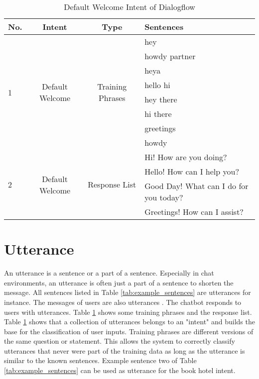 \begin{table}[H]
    \centering
    \begin{tabular}{ l | c | c | l }
  No. & Intent & Type & Sentences \\ \hline \hline
  \multirow{8}{*}{1}
  & \multirow{8}{*}{Default Welcome} & \multirow{8}{*}{Training Phrases} & hey \\
      & & & howdy partner\\
      & & & heya\\ 
      & & & hello hi\\ 
      & & & hey there\\ 
      & & & hi there\\ 
      & & & greetings\\ 
      & & & howdy \\ \hline
  \multirow{4}{*}{2}
  & \multirow{4}{*}{Default Welcome} & \multirow{4}{*}{Response List} & Hi! How are you doing? \\
      & & & Hello! How can I help you?\\
      & & & Good Day! What can I do for you today?\\ 
      & & & Greetings! How can I assist?\\ \hline
\end{tabular}
    \caption{Default Welcome Intent of Dialogflow} \label{tab:defaultwelcomedialogflow}
\end{table} \noindent



\section{Utterance} \label{sec:utterance}
An utterance is a sentence or a part of a sentence.
Especially in chat environments, an utterance is often just a part of a sentence to shorten the message. 
All sentences listed in Table \ref{tab:example_sentences} are utterances for instance.
The messages of users are also utterances \cite{singhbuilding, dutta2017developing}.
The chatbot responds to users with utterances.
Table \ref{tab:defaultwelcomedialogflow} shows some training phrases and the response list.
Table \ref{tab:defaultwelcomedialogflow} shows that a collection of utterances belongs to an "intent" and builds the base for the classification of user inputs.
Training phrases are different versions of the same question or statement.
This allows the system to correctly classify utterances that never were part of the training data as long as the utterance is similar to the known sentences.
Example sentence two of Table \ref{tab:example_sentences} can be used 
as utterance for the book hotel intent.

